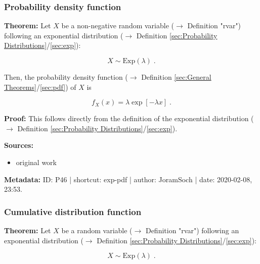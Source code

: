 \documentclass[a4paper,12pt]{book}
\begin{document}
\subsubsection[\textbf{Probability density function}]{Probability density function} \label{sec:exp-pdf}

\vspace{1em}
\textbf{Theorem:} Let $X$ be a non-negative random variable ($\rightarrow$ Definition "rvar") following an exponential distribution ($\rightarrow$ Definition \ref{sec:Probability Distributions}/\ref{sec:exp}):

\begin{equation} \label{eq:exp-pdf-exp}
X \sim \mathrm{Exp}(\lambda) \; .
\end{equation}

Then, the probability density function ($\rightarrow$ Definition \ref{sec:General Theorems}/\ref{sec:pdf}) of $X$ is

\begin{equation} \label{eq:exp-pdf-gam-pdf}
f_X(x) = \lambda \exp[-\lambda x] \; .
\end{equation}


\vspace{1em}
\textbf{Proof:} This follows directly from the definition of the exponential distribution ($\rightarrow$ Definition \ref{sec:Probability Distributions}/\ref{sec:exp}).

\vspace{1em}
\textbf{Sources:}
\begin{itemize}
\item original work\end{itemize}


\vspace{1em}
\textbf{Metadata:} ID: P46 | shortcut: exp-pdf | author: JoramSoch | date: 2020-02-08, 23:53.


\subsubsection[\textbf{Cumulative distribution function}]{Cumulative distribution function} \label{sec:exp-cdf}

\vspace{1em}
\textbf{Theorem:} Let $X$ be a random variable ($\rightarrow$ Definition "rvar") following an exponential distribution ($\rightarrow$ Definition \ref{sec:Probability Distributions}/\ref{sec:exp}):

\begin{equation} \label{eq:exp-cdf-exp}
X \sim \mathrm{Exp}(\lambda) \; .
\end{equation}
\end{document}
